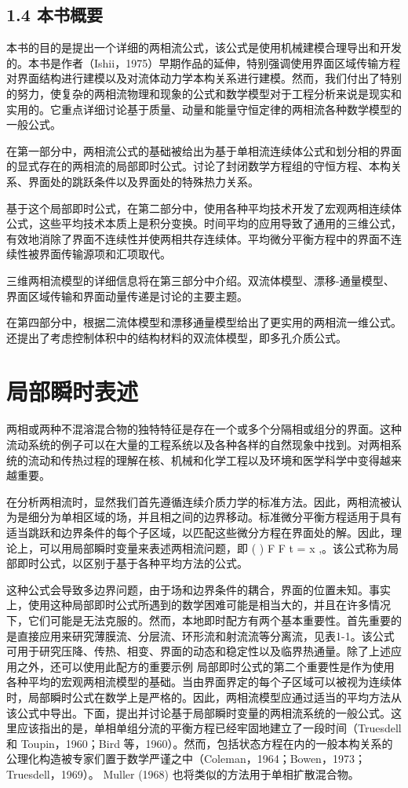\documentclass[11pt,a4paper,openany,fontset=none]{ctexbook}
\begin{document}
\section*{1.4 本书概要}
本书的目的是提出一个详细的两相流公式，该公式是使用机械建模合理导出和开发的。本书是作者（Ishii，1975）早期作品的延伸，特别强调使用界面区域传输方程对界面结构进行建模以及对流体动力学本构关系进行建模。然而，我们付出了特别的努力，使复杂的两相流物理和现象的公式和数学模型对于工程分析来说是现实和实用的。它重点详细讨论基于质量、动量和能量守恒定律的两相流各种数学模型的一般公式。

在第一部分中，两相流公式的基础被给出为基于单相流连续体公式和划分相的界面的显式存在的两相流的局部即时公式。讨论了封闭数学方程组的守恒方程、本构关系、界面处的跳跃条件以及界面处的特殊热力关系。

基于这个局部即时公式，在第二部分中，使用各种平均技术开发了宏观两相连续体公式，这些平均技术本质上是积分变换。时间平均的应用导致了通用的三维公式，有效地消除了界面不连续性并使两相共存连续体。平均微分平衡方程中的界面不连续性被界面传输源项和汇项取代。

三维两相流模型的详细信息将在第三部分中介绍。双流体模型、漂移-通量模型、界面区域传输和界面动量传递是讨论的主要主题。

\enlargethispage{2\baselineskip}
在第四部分中，根据二流体模型和漂移通量模型给出了更实用的两相流一维公式。还提出了考虑控制体积中的结构材料的双流体模型，即多孔介质公式。

\chapter{局部瞬时表述}
两相或两种不混溶混合物的独特特征是存在一个或多个分隔相或组分的界面。这种流动系统的例子可以在大量的工程系统以及各种各样的自然现象中找到。对两相系统的流动和传热过程的理解在核、机械和化学工程以及环境和医学科学中变得越来越重要。

在分析两相流时，显然我们首先遵循连续介质力学的标准方法。因此，两相流被认为是细分为单相区域的场，并且相之间的边界移动。标准微分平衡方程适用于具有适当跳跃和边界条件的每个子区域，以匹配这些微分方程在界面处的解。因此，理论上，可以用局部瞬时变量来表述两相流问题，即 ( ) F F t = x ,。该公式称为局部即时公式，以区别于基于各种平均方法的公式。

这种公式会导致多边界问题，由于场和边界条件的耦合，界面的位置未知。事实上，使用这种局部即时公式所遇到的数学困难可能是相当大的，并且在许多情况下，它们可能是无法克服的。然而，本地即时配方有两个基本重要性。首先重要的是直接应用来研究薄膜流、分层流、环形流和射流流等分离流，见表1-1。该公式可用于研究压降、传热、相变、界面的动态和稳定性以及临界热通量。除了上述应用之外，还可以使用此配方的重要示例
局部即时公式的第二个重要性是作为使用各种平均的宏观两相流模型的基础。当由界面界定的每个子区域可以被视为连续体时，局部瞬时公式在数学上是严格的。因此，两相流模型应通过适当的平均方法从该公式中导出。下面，提出并讨论基于局部瞬时变量的两相流系统的一般公式。这里应该指出的是，单相单组分流的平衡方程已经牢固地建立了一段时间（Truesdell 和 Toupin，1960；Bird 等，1960）。然而，包括状态方程在内的一般本构关系的公理化构造被专家们置于数学严谨之中（Coleman，1964；Bowen，1973；Truesdell，1969）。 Muller (1968) 也将类似的方法用于单相扩散混合物。
\end{document}
